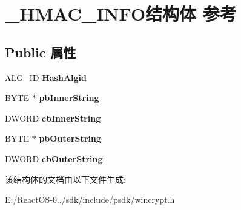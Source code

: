 \hypertarget{struct___h_m_a_c___i_n_f_o}{}\section{\+\_\+\+H\+M\+A\+C\+\_\+\+I\+N\+F\+O结构体 参考}
\label{struct___h_m_a_c___i_n_f_o}
\subsection*{Public 属性}
\begin{DoxyCompactItemize}
\item 
\mbox{\label{struct___h_m_a_c___i_n_f_o_af840150346ed2eabfebb5e91c223f3a6}} 
A\+L\+G\+\_\+\+ID {\bfseries Hash\+Algid}
\item 
\mbox{\label{struct___h_m_a_c___i_n_f_o_a83617cb6e0753746857fb9319c079c06}} 
B\+Y\+TE $\ast$ {\bfseries pb\+Inner\+String}
\item 
\mbox{\label{struct___h_m_a_c___i_n_f_o_a353a08ddc4792a123c780193406c68b7}} 
D\+W\+O\+RD {\bfseries cb\+Inner\+String}
\item 
\mbox{\label{struct___h_m_a_c___i_n_f_o_a45ebec8f7dd7e4d0aa33503f073af598}} 
B\+Y\+TE $\ast$ {\bfseries pb\+Outer\+String}
\item 
\mbox{\label{struct___h_m_a_c___i_n_f_o_a47fa113943f87f74ee238008c29d1f78}} 
D\+W\+O\+RD {\bfseries cb\+Outer\+String}
\end{DoxyCompactItemize}


该结构体的文档由以下文件生成\+:\begin{DoxyCompactItemize}
\item 
E\+:/\+React\+O\+S-\/0../sdk/include/psdk/wincrypt.\+h\end{DoxyCompactItemize}
